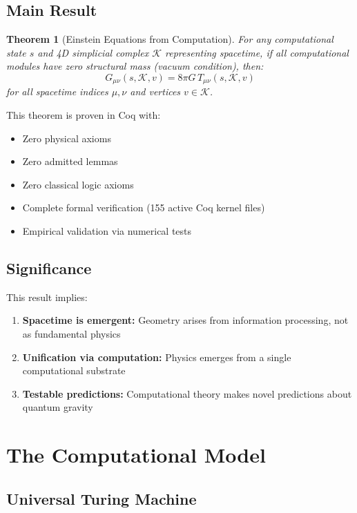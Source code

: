 \documentclass[11pt,twocolumn]{article}
\newtheorem{theorem}{Theorem}
\begin{document}
\subsection{Main Result}

\begin{theorem}[Einstein Equations from Computation]
For any computational state $s$ and 4D simplicial complex $\mathcal{K}$ representing spacetime, if all computational modules have zero structural mass (vacuum condition), then:
\begin{equation}
G_{\mu\nu}(s,\mathcal{K},v) = 8\pi G \, T_{\mu\nu}(s,\mathcal{K},v)
\end{equation}
for all spacetime indices $\mu,\nu$ and vertices $v \in \mathcal{K}$.
\end{theorem}

This theorem is proven in Coq with:
\begin{itemize}
\item Zero physical axioms
\item Zero admitted lemmas
\item Zero classical logic axioms
\item Complete formal verification (155 active Coq kernel files)
\item Empirical validation via numerical tests
\end{itemize}

\subsection{Significance}

This result implies:
\begin{enumerate}
\item \textbf{Spacetime is emergent:} Geometry arises from information processing, not as fundamental physics
\item \textbf{Unification via computation:} Physics emerges from a single computational substrate
\item \textbf{Testable predictions:} Computational theory makes novel predictions about quantum gravity
\end{enumerate}

\section{The Computational Model}

\subsection{Universal Turing Machine}
\end{document}
